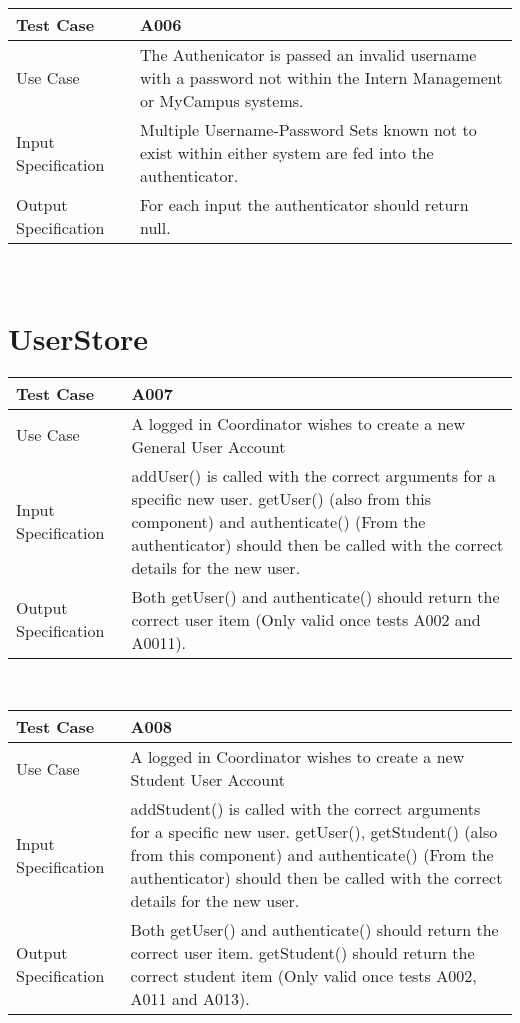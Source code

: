 \documentclass[12pt,a4paper,english,intoc,bibliography=totoc,index=totoc,BCOR10mm,captions=tableheading,titlepage,fleqn]{scrbook}
\providecommand{\tabularnewline}{\\}
\begin{document}
\begin{tabular}{lp{10cm}}
\hline 
\textbf{Test Case} & A006\tabularnewline
\hline 
\hline 
Use Case & The Authenicator is passed an invalid username with a password not within the Intern Management or MyCampus systems.\tabularnewline
\hline 
Input Specification & Multiple Username-Password Sets known not to exist within either system are fed into the authenticator.\tabularnewline
\hline 
Output Specification & For each input the authenticator should return null.\tabularnewline
\hline 
\end{tabular}\\

\section*{UserStore}

\begin{tabular}{lp{10cm}}
\hline 
\textbf{Test Case} & A007\tabularnewline
\hline 
\hline 
Use Case & A logged in Coordinator wishes to create a new General User Account\tabularnewline
\hline 
Input Specification & addUser() is called with the correct arguments for a specific new user. getUser() (also from this component) and authenticate() (From the authenticator) should then be called with the correct details for the new user.\tabularnewline
\hline 
Output Specification & Both getUser() and authenticate() should return the correct user item (Only valid once tests A002 and A0011).\tabularnewline
\hline 
\end{tabular}\\

\begin{tabular}{lp{10cm}}
\hline 
\textbf{Test Case} & A008\tabularnewline
\hline 
\hline 
Use Case & A logged in Coordinator wishes to create a new Student User Account\tabularnewline
\hline 
Input Specification & addStudent() is called with the correct arguments for a specific new user. getUser(), getStudent() (also from this component) and authenticate() (From the authenticator) should then be called with the correct details for the new user.\tabularnewline
\hline 
Output Specification & Both getUser() and authenticate() should return the correct user item. getStudent() should return the correct student item (Only valid once tests A002, A011 and A013).\tabularnewline
\hline 
\end{tabular}\\
\end{document}
